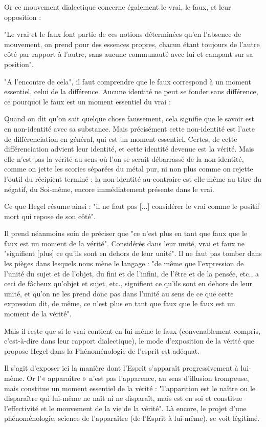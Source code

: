 Or ce mouvement dialectique concerne également le vrai, le faux, et leur opposition :

"Le vrai et le faux font partie de ces notions déterminées qu’en l’absence de mouvement, on prend pour des essences propres, chacun étant toujours de l’autre côté par rapport à l’autre, sans aucune communauté avec lui et campant sur sa position".

"A l’encontre de cela", il faut comprendre que le faux correspond à un moment essentiel, celui de la différence. Aucune identité ne peut se fonder sans différence, ce pourquoi le faux est un moment essentiel du vrai :

    Quand on dit qu’on sait quelque chose faussement, cela signifie que le savoir est en non-identité avec sa substance. Mais précisément cette non-identité est l’acte de différenciation en général, qui est un moment essentiel. Certes, de cette différenciation advient leur identité, et cette identité devenue est la vérité. Mais elle n’est pas la vérité au sens où l’on se serait débarrassé de la non-identité, comme on jette les scories séparées du métal pur, ni non plus comme on rejette l’outil du récipient terminé : la non-identité au-contraire est elle-même au titre du négatif, du Soi-même, encore immédiatement présente dans le vrai.

Ce que Hegel résume ainsi : "il ne faut pas [...] considérer le vrai comme le positif mort qui repose de son côté".

Il prend néanmoins soin de préciser que "ce n’est plus en tant que faux que le faux est un moment de la vérité". Considérés dans leur unité, vrai et faux ne "signifient [plus] ce qu’ils sont en dehors de leur unité". Il ne faut pas tomber dans les pièges dans lesquels nous mène le langage : "de même que l’expression de l’unité du sujet et de l’objet, du fini et de l’infini, de l’être et de la pensée, etc., a ceci de fâcheux qu’objet et sujet, etc., signifient ce qu’ils sont en dehors de leur unité, et qu’on ne les prend donc pas dans l’unité au sens de ce que cette expression dit, de même, ce n’est plus en tant que faux que le faux est un moment de la vérité".

Mais il reste que si le vrai contient en lui-même le faux (convenablement compris, c’est-à-dire dans leur rapport dialectique), le mode d’exposition de la vérité que propose Hegel dans la Phénoménologie de l’esprit est adéquat.

Il s’agit d’exposer ici la manière dont l’Esprit s’apparaît progressivement à lui-même. Or l’« apparaître » n’est pas l’apparence, au sens d’illusion trompeuse, mais constitue un moment essentiel de la vérité : "l’apparition est le naître ou le disparaître qui lui-même ne naît ni ne disparaît, mais est en soi et constitue l’effectivité et le mouvement de la vie de la vérité". Là encore, le projet d’une phénoménologie, science de l’apparaître (de l’Esprit à lui-même), se voit légitimé.

